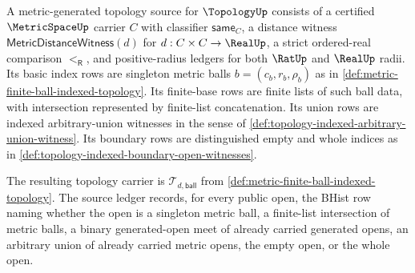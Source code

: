 
\begin{definition}
\label{def:topology-metric-generated-carrier}
A metric-generated topology source for $\TopologyUp$ consists of a certified $\MetricSpaceUp$ carrier $C$ with classifier $\mathsf{same}_C$, a distance witness $\mathsf{MetricDistanceWitness}(d)$ for $d:C\times C\to\RealUp$, a strict ordered-real comparison $<_{\mathsf R}$, and positive-radius ledgers for both $\RatUp$ and $\RealUp$ radii. Its basic index rows are singleton metric balls $b=(c_b,r_b,\rho_b)$ as in \autoref{def:metric-finite-ball-indexed-topology}. Its finite-base rows are finite lists of such ball data, with intersection represented by finite-list concatenation. Its union rows are indexed arbitrary-union witnesses in the sense of \autoref{def:topology-indexed-arbitrary-union-witness}. Its boundary rows are distinguished empty and whole indices as in \autoref{def:topology-indexed-boundary-open-witnesses}.

The resulting topology carrier is $\mathcal{T}_{d,\mathsf{ball}}$ from \autoref{def:metric-finite-ball-indexed-topology}. The source ledger records, for every public open, the BHist row naming whether the open is a singleton metric ball, a finite-list intersection of metric balls, a binary generated-open meet of already carried generated opens, an arbitrary union of already carried metric opens, the empty open, or the whole open.
\end{definition}

